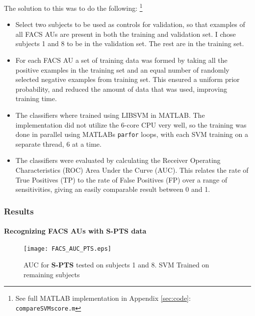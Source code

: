 \documentclass[Main]{subfiles}
\begin{document}
			The solution to this was to do the following:
			\footnote{See full MATLAB implementation in Appendix \ref{sec:code}: \texttt{compareSVMscore.m}}
			\begin{itemize}
				\item
				Select two subjects to be used as controls for validation, so that examples of all FACS AUs are present in both the training and validation set.
				I chose subjects 1 and 8 to be in the validation set.
				The rest are in the training set.

				\item
				For each FACS AU a set of training data was formed by taking all the positive examples in the training set and an equal number of randomly selected negative examples from training set.
				This ensured a uniform prior probability, and reduced the amount of data that was used, improving training time.

				\item
				The classifiers where trained using LIBSVM \cite{CC01a} in MATLAB.
				The implementation did not utilize the 6-core CPU very well, so the training was done in parallel using MATLABs \texttt{parfor} loops, with each SVM training on a separate thread, 6 at a time.

				\item
				The classifiers were evaluated by calculating the Receiver Operating Characteristics (ROC) Area Under the Curve (AUC).
				This relates the rate of True Positives (TP) to the rate of False Positives (FP) over a range of sensitivities, giving an easily comparable result between 0 and 1.

			\end{itemize}


		\subsubsection{Results} %
			\label{ssub:results_ex1}

			\paragraph{Recognizing FACS AUs with \textbf{S-PTS} data} %
				\label{par:recognizing_facs_aus_with_s-pts}
				\vspace{-2mm} 
				\begin{figure}[H]
					\begin{center}
						\texttt{[image: FACS\_AUC\_PTS.eps]}
					\end{center}
					\caption{
						AUC for \textbf{S-PTS} tested on subjects 1 and 8.
						SVM Trained on remaining subjects
						}
					\label{fig:spts_auc}
				\end{figure}
				
\end{document}
